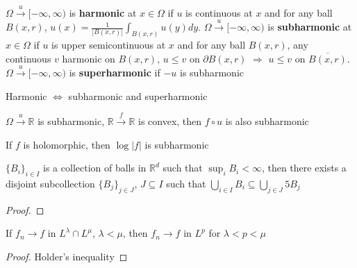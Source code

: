 \documentclass[main]{subfiles}
\begin{document}
\begin{definition}
$\Omega\xrightarrow{u}[-\infty,\infty)$ is \textbf{harmonic} at $x\in\Omega$ if $u$ is continuous at $x$ and for any ball $B(x,r)$, $\displaystyle u(x)=\frac{1}{|B(x,r)|}\int_{B(x,r)}u(y)dy$. $\Omega\xrightarrow{u}[-\infty,\infty)$ is \textbf{subharmonic} at $x\in\Omega$ if $u$ is upper semicontinuous at $x$ and for any ball $B(x,r)$, any continuous $v$ harmonic on $B(x,r)$, $u\leq v$ on $\partial B(x,r)$ $\Rightarrow$ $u\leq v$ on $\overline{B(x,r)}$. $\Omega\xrightarrow{u}[-\infty,\infty)$ is \textbf{superharmonic} if $-u$ is subharmonic \par
Harmonic $\Leftrightarrow$ subharmonic and superharmonic
\end{definition}

\begin{lemma}
$\Omega\xrightarrow u\mathbb R$ is subharmonic, $\mathbb R\xrightarrow f\mathbb R$ is convex, then $f\circ u$ is also subharmonic
\end{lemma}

\begin{example}\label{f holomorphic => log|f| subharmonic}
If $f$ is holomorphic, then $\log|f|$ is subharmonic
\end{example}

\begin{lemma}
$\{B_i\}_{i\in I}$ is a collection of balls in $\mathbb R^d$ such that $\sup_i B_i<\infty$, then there exists a disjoint subcollection $\{B_j\}_{j\in J}$, $J\subseteq I$ such that $\bigcup_{i\in I}B_i\subseteq\bigcup_{j\in J}5B_j$
\end{lemma}

\begin{proof}

\end{proof}

\begin{theorem}

\end{theorem}

\begin{theorem}[Interpolation]
If $f_n\to f$ in $L^\lambda\cap L^\mu$, $\lambda<\mu$, then $f_n\to f$ in $L^p$ for $\lambda<p<\mu$
\end{theorem}

\begin{proof}
Holder's inequality
\end{proof}
\end{document}
